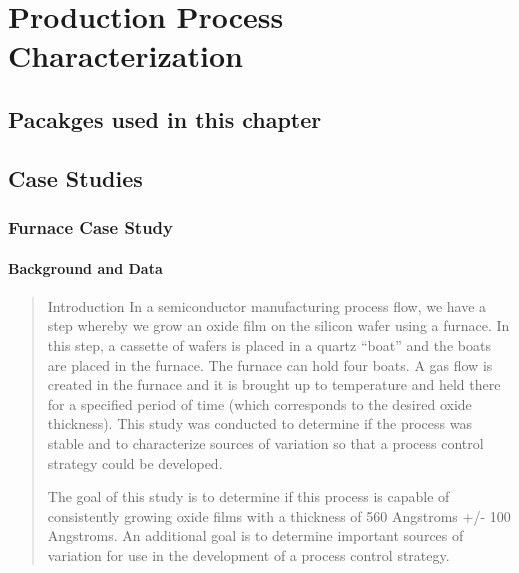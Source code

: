 \documentclass[]{book}
\theoremstyle{definition}
\theoremstyle{definition}
\theoremstyle{definition}
\theoremstyle{remark}
\begin{document}
\hypertarget{production-process-characterization}{%
\chapter{Production Process
Characterization}\label{production-process-characterization}}

\hypertarget{pacakges-used-in-this-chapter}{%
\section{Pacakges used in this
chapter}\label{pacakges-used-in-this-chapter}}

\hypertarget{case-studies-1}{%
\section{Case Studies}\label{case-studies-1}}

\hypertarget{furnace-case-study}{%
\subsection{Furnace Case Study}\label{furnace-case-study}}

\hypertarget{background-and-data-2}{%
\subsubsection{Background and Data}\label{background-and-data-2}}

\begin{quote}
Introduction In a semiconductor manufacturing process flow, we have a
step whereby we grow an oxide film on the silicon wafer using a furnace.
In this step, a cassette of wafers is placed in a quartz ``boat'' and
the boats are placed in the furnace. The furnace can hold four boats. A
gas flow is created in the furnace and it is brought up to temperature
and held there for a specified period of time (which corresponds to the
desired oxide thickness). This study was conducted to determine if the
process was stable and to characterize sources of variation so that a
process control strategy could be developed.

The goal of this study is to determine if this process is capable of
consistently growing oxide films with a thickness of 560 Angstroms +/-
100 Angstroms. An additional goal is to determine important sources of
variation for use in the development of a process control strategy.
\end{quote}
\end{document}
